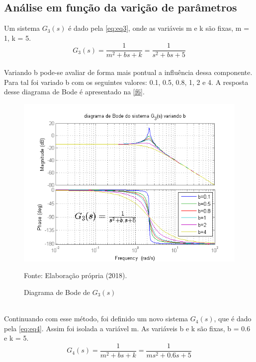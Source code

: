 \subsection{Análise em função da varição de parâmetros}
Um sistema $G_3(s)$ é dado pela \autoref{eq:eq3}, onde as variáveis m e k são fixas, m = 1, k = 5.
\\
\begin{equation}
    G_3(s) = \frac{1}{m^{2} + bs + k} = \frac{1}{s^{2} + bs + 5}
    \label{eq:eq3}
\end{equation}
\\\indent
Variando b pode-se avaliar de forma mais pontual a influência dessa componente. Para tal foi variado b com os seguintes valores: 0.1, 0.5, 0.8, 1, 2 e 4. A resposta desse diagrama de Bode é apresentado na \autoref{f6}.
 \\
\begin{figure}[h!]
    \centering
    \caption{Diagrama de Bode de $G_3(s)$}
    \includegraphics[scale=0.55]{img/task_7_06.png}
    \label{f6}
    \begin{flushleft}
        Fonte: Elaboração própria (2018).
    \end{flushleft}
\end{figure}
\\\indent
Continuando com esse método, foi definido um novo sistema $G_4(s)$, que é dado pela \autoref{eq:eq4}. Assim foi isolada a variável m. As variáveis b e k são fixas, b = 0.6 e k = 5. 
\\
\begin{equation}
    G_4(s) = \frac{1}{m^{2} + bs + k} = \frac{1}{ms^{2} + 0.6s + 5}
    \label{eq:eq4}
\end{equation}
